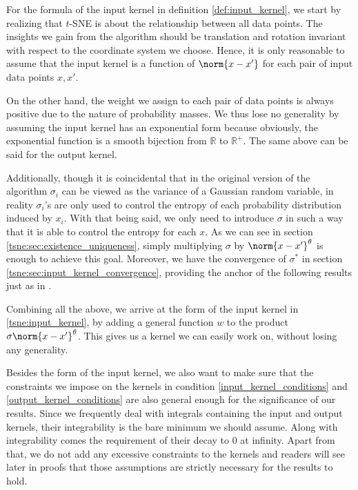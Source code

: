 For the formula of the input kernel in definition \ref{def:input_kernel}, we
start by realizing that $t$-SNE is about the relationship between all data
points. The insights we gain from the algorithm should be translation and
rotation invariant with respect to the coordinate system we choose. Hence, it
is only reasonable to assume that the input kernel is a function of
$\norm{x-x'}$ for each pair of input data points $x,x'$.

On the other hand, the weight we assign to each pair of data points is always
positive due to the nature of probability masses. We thus lose no generality by
assuming the input kernel has an exponential form because obviously, the
exponential function is a smooth bijection from $\mathbb{R}$ to $\mathbb{R}^+$.
The same above can be said for the output kernel.

Additionally, though it is coincidental that in the original version of the
algorithm $\sigma_i$ can be viewed as the variance of a Gaussian random
variable, in reality $\sigma_i$'s are only used to control the entropy of each
probability distribution induced by $x_i$. With that being said, we only need
to introduce $\sigma$ in such a way that it is able to control the entropy for
each $x$. As we can see in section \ref{tsne:sec:existence_uniqueness}, simply
multiplying $\sigma$ by $\norm{x-x'}^{\theta}$ is enough to achieve this goal.
Moreover, we have the convergence of $\sigma^*$ in section
\ref{tsne:sec:input_kernel_convergence}, providing the anchor of the following
results just as in \cite{auffinger-tsne}.

Combining all the above, we arrive at the form of the input kernel in
\eqref{tsne:input_kernel}, by adding a general function $w$ to the product
$\sigma \norm{x-x'}^{\theta}$. This gives us a kernel we can easily work on,
without losing any generality.

Besides the form of the input kernel, we also want to make sure that the
constraints we impose on the kernels in condition \ref{input_kernel_conditions}
and \ref{output_kernel_conditions} are also general enough for the significance
of our results. Since we frequently deal with integrals containing the input
and output kernels, their integrability is the bare minimum we should assume.
Along with integrability comes the requirement of their decay to 0 at infinity.
Apart from that, we do not add any excessive constraints to the kernels and
readers will see later in proofs that those assumptions are strictly necessary
for the results to hold.


